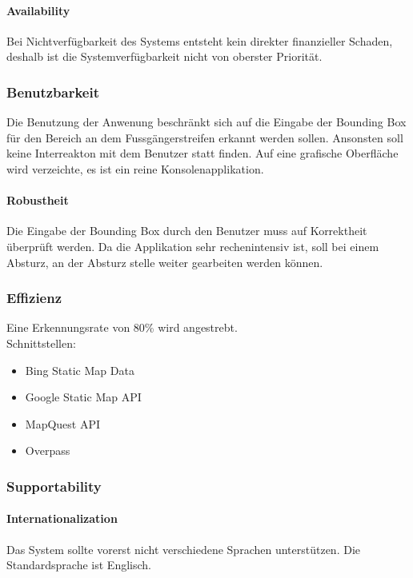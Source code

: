 \paragraph{Availability}
Bei Nichtverfügbarkeit des Systems entsteht kein direkter finanzieller Schaden, deshalb ist die Systemverfügbarkeit nicht von oberster Priorität. 
\subsubsection{Benutzbarkeit}
Die Benutzung der Anwenung beschränkt sich auf die Eingabe der Bounding Box für den Bereich an dem Fussgängerstreifen erkannt werden sollen. Ansonsten soll keine Interreakton mit dem Benutzer statt finden. Auf eine grafische Oberfläche wird verzeichte, es ist ein reine Konsolenapplikation.

\paragraph{Robustheit}
Die Eingabe der Bounding Box durch den Benutzer muss auf Korrektheit überprüft werden. Da die Applikation sehr rechenintensiv ist, soll bei einem Absturz, an der Absturz stelle weiter gearbeiten werden können.
\subsubsection{Effizienz}
Eine Erkennungsrate von 80\% wird angestrebt.\\
Schnittstellen:
\begin{itemize}
	\item Bing Static Map Data
	\item Google Static Map API
	\item MapQuest API
	\item Overpass
\end{itemize}

\subsubsection{Supportability}
\paragraph{Internationalization}
Das System sollte vorerst nicht verschiedene Sprachen unterstützen. 
Die Standardsprache ist Englisch.


